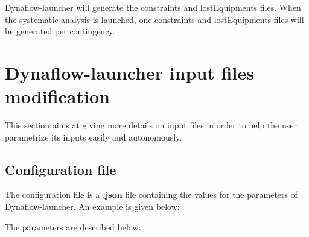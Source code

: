 \documentclass[a4paper, 12pt]{report}
\begin{document}
Dynaflow-launcher will generate the constraints and lostEquipments files.
When the systematic analysis is launched, one constraints and lostEquipments files will be generated per contingency.

\section[Dynaflow-launcher input files modification]{Dynaflow-launcher input files modification}

This section aims at giving more details on input files in order to help the user parametrize its inputs easily and autonomously.

\subsection{Configuration file}
\label{Dynaflow_Launcher_Configuration_Configuration_File}

The configuration file is a \textbf{.json} file containing the values for the parameters of Dynaflow-launcher. An example is given below:



The parameters are described below:
\end{document}
